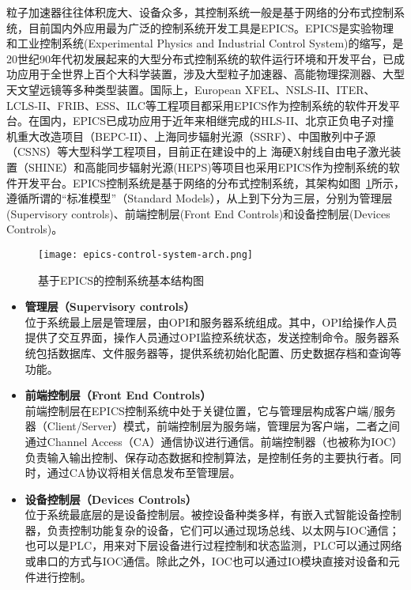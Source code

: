 粒子加速器往往体积庞大、设备众多，其控制系统一般是基于网络的分布式控制系统，目前国内外应用最为广泛的控制系统开发工具是EPICS。EPICS是实验物理和工业控制系统(Experimental Physics and Industrial Control System)的缩写，是20世纪90年代初发展起来的大型分布式控制系统的软件运行环境和开发平台，已成功应用于全世界上百个大科学装置，涉及大型粒子加速器、高能物理探测器、大型天文望远镜等多种类型装置\cite{EPICS}。国际上，European XFEL、NSLS-II、ITER、LCLS-II、FRIB、ESS、ILC等工程项目都采用EPICS作为控制系统的软件开发平台\cite{Aghababyan2015,Carcassi2009,Wallander,Flath2017,Shen2016,Arredondo2013,carwardine-2007}。在国内，EPICS已成功应用于近年来相继完成的HLS-II、北京正负电子对撞机重大改造项目（BEPC-II）、上海同步辐射光源（SSRF）、中国散列中子源（CSNS）等大型科学工程项目\cite{liweimin-control-2007, Zhao2007,Shen2010,C.H.Wang2011}，目前正在建设中的上
海硬X射线自由电子激光装置（SHINE）和高能同步辐射光源(HEPS)等项目也采用EPICS作为控制系统的软件开发平台\cite{Lv2018a,Chu2018a}。EPICS控制系统是基于网络的分布式控制系统，其架构如图~\ref{fig:epics-control-system-arch}所示，遵循所谓的“标准模型”（Standard Models）\cite{Kuiper1991}，从上到下分为三层，分别为管理层(Supervisory controls)、前端控制层(Front End Controls)和设备控制层(Devices Controls)。

\begin{figure}[!htb]
	\centering
	\texttt{[image: epics-control-system-arch.png]}
	\caption{基于EPICS的控制系统基本结构图}
	\label{fig:epics-control-system-arch}
\end{figure}

\begin{itemize}
	\item \textbf{管理层（Supervisory controls）} \\ 
	位于系统最上层是管理层，由OPI和服务器系统组成。其中，OPI给操作人员提供了交互界面，操作人员通过OPI监控系统状态，发送控制命令。服务器系统包括数据库、文件服务器等，提供系统初始化配置、历史数据存档和查询等功能。
	\item \textbf{前端控制层（Front End Controls）} \\ 
	前端控制层在EPICS控制系统中处于关键位置，它与管理层构成客户端/服务器（Client/Server）模式，前端控制层为服务端，管理层为客户端，二者之间通过Channel Access（CA）通信协议进行通信。前端控制器（也被称为IOC）负责输入输出控制、保存动态数据和控制算法，是控制任务的主要执行者。同时，通过CA协议将相关信息发布至管理层。
	\item \textbf{设备控制层（Devices Controls）} \\ 
	位于系统最底层的是设备控制层。被控设备种类多样，有嵌入式智能设备控制器，负责控制功能复杂的设备，它们可以通过现场总线、以太网与IOC通信；也可以是PLC，用来对下层设备进行过程控制和状态监测，PLC可以通过网络或串口的方式与IOC通信。除此之外，IOC也可以通过IO模块直接对设备和元件进行控制。
\end{itemize}

